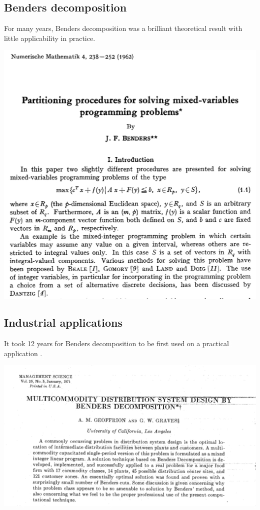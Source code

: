\newpage

\subsection*{Benders decomposition}



For many years, Benders decomposition \cite{benders62partitioning}  was a brilliant theoretical result with little applicability in practice. 


\begin{center}
\includegraphics[width=14cm]{fig/fig1}
\end{center}


\newpage

\subsection*{Industrial applications}


It took 12 years for Benders decomposition to be first used on a practical application  \cite{geoffrion74multicommodity}. 


\begin{center}
\includegraphics[width=14cm]{fig//fig2}
\end{center}



